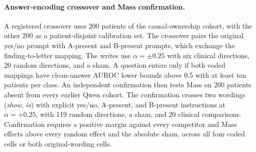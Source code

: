 \paragraph{Answer-encoding crossover and Mass confirmation.} A registered crossover uses 200 patients of the causal-ownership cohort, with the other 200 as a patient-disjoint calibration set. The crossover pairs the original yes/no prompt with A-present and B-present prompts, which exchange the finding-to-letter mapping. The writes use $\alpha=\pm0.25$ with six clinical directions, 20 random directions, and a sham. A question enters only if both coded mappings have clean-answer AUROC lower bounds above 0.5 with at least ten patients per class. An independent confirmation then tests Mass on 200 patients absent from every earlier Qwen cohort. The confirmation crosses two wordings (\textit{show}, \textit{is}) with explicit yes/no, A-present, and B-present instructions at $\alpha=+0.25$, with 119 random directions, a sham, and 20 clinical comparisons. Confirmation requires a positive margin against every competitor and Mass effects above every random effect and the absolute sham, across all four coded cells or both original-wording cells.

